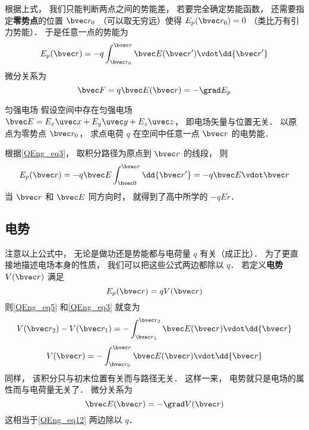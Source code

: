 根据上式， 我们只能判断两点之间的势能差， 若要完全确定势能函数， 还需要指定\textbf{零势点}的位置 $\bvec r_0$ （可以取无穷远）使得 $E_p(\bvec r_0) = 0$ （类比万有引力势能）． 于是任意一点的势能为
\begin{equation}\label{QEng_eq3}
E_p(\bvec r) = -q \int_{\bvec r_0}^{\bvec r} \bvec E(\bvec r') \vdot \dd{\bvec r'}
\end{equation}
微分关系为
\begin{equation}\label{QEng_eq12}
\bvec F = q\bvec E(\bvec r) = -\grad E_p
\end{equation}

\begin{example}{匀强电场}
假设空间中存在匀强电场 $\bvec E = E_x \uvec x + E_y \uvec y + E_z \uvec z$， 即电场矢量与位置无关． 以原点为零势点 $\bvec r_0$， 求点电荷 $q$ 在空间中任意一点 $\bvec r$ 的电势能．

根据\autoref{QEng_eq3}， 取积分路径为原点到 $\bvec r$ 的线段， 则
\begin{equation}
E_p(\bvec r) = -q \bvec E \int_{\bvec 0}^{\bvec r} \dd{\bvec r'} = -q \bvec E \vdot \bvec r
\end{equation}
当 $\bvec r$ 和 $\bvec E$ 同方向时， 就得到了高中所学的 $-qEr$．
\end{example}

\subsection{电势}
注意以上公式中， 无论是做功还是势能都与电荷量 $q$ 有关（成正比）． 为了更直接地描述电场本身的性质， 我们可以把这些公式两边都除以 $q$． 若定义\textbf{电势} $V(\bvec r)$ 满足
\begin{equation}
E_p(\bvec r) = q V(\bvec r)
\end{equation}
则\autoref{QEng_eq5} 和\autoref{QEng_eq3} 就变为
\begin{equation}\label{QEng_eq1}
V(\bvec r_2) - V(\bvec r_1) = - \int_{\bvec r_1}^{\bvec r_2} \bvec E(\bvec r) \vdot \dd{\bvec r}
\end{equation}
\begin{equation}\label{QEng_eq9}
V(\bvec r) = -\int_{\bvec r_0}^{\bvec r} \bvec E(\bvec r) \vdot \dd{\bvec r}
\end{equation}
同样， 该积分只与初末位置有关而与路径无关． 这样一来， 电势就只是电场的属性而与电荷量无关了． 微分关系为
\begin{equation}\label{QEng_eq13}
\bvec E(\bvec r) = -\grad V(\bvec r)
\end{equation}
这相当于\autoref{QEng_eq12} 两边除以 $q$．

